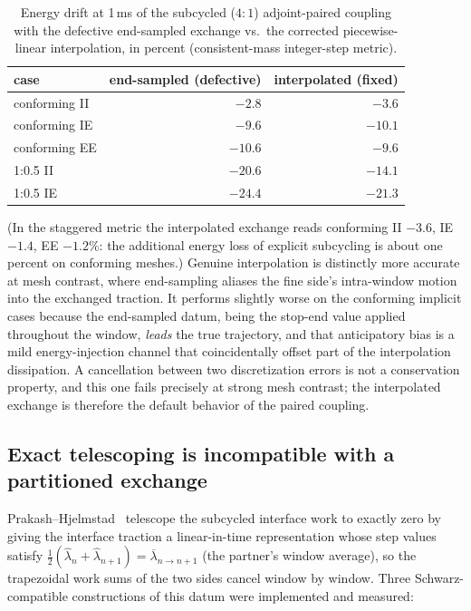 \documentclass[11pt]{article}
\begin{document}
\begin{table}[htbp]
\centering
\caption{Energy drift at 1\,ms of the subcycled ($4{:}1$) adjoint-paired
coupling with the defective end-sampled exchange vs.\ the corrected
piecewise-linear interpolation, in percent (consistent-mass integer-step
metric).}
\label{tab:subcycled}
\begin{tabular}{lrr}
\toprule
case & end-sampled (defective) & interpolated (fixed) \\
\midrule
conforming II & $-2.8$ & $-3.6$ \\
conforming IE & $-9.6$ & $-10.1$ \\
conforming EE & $-10.6$ & $-9.6$ \\
1:0.5 II & $-20.6$ & $\mathbf{-14.1}$ \\
1:0.5 IE & $-24.4$ & $\mathbf{-21.3}$ \\
\bottomrule
\end{tabular}
\end{table}

(In the staggered metric the interpolated exchange reads conforming II
$-3.6$, IE $-1.4$, EE $-1.2\%$: the additional energy loss of explicit subcycling is about
one percent on conforming meshes.) Genuine interpolation is distinctly more accurate
at mesh contrast, where end-sampling aliases the fine side's intra-window
motion into the exchanged traction. It performs slightly worse on the conforming
implicit cases because the end-sampled datum, being the stop-end value
applied throughout the window, \emph{leads} the true trajectory, and that
anticipatory bias is a mild energy-injection channel that coincidentally
offset part of the interpolation dissipation. A cancellation between two
discretization errors is not a conservation property, and this one fails
precisely at strong mesh contrast; the interpolated exchange is therefore the
default behavior of the paired coupling.

\subsection{Exact telescoping is incompatible with a partitioned exchange}
\label{sec:ph}

Prakash--Hjelmstad~\cite{PrakashHjelmstad2004} telescope the subcycled
interface work to exactly zero by giving the interface traction a
linear-in-time representation whose step values satisfy
$\tfrac12(\hat\lambda_n + \hat\lambda_{n+1})
 = \overline{\lambda}_{n \to n+1}$
(the partner's window average), so the trapezoidal work sums of the two
sides cancel window by window. Three Schwarz-compatible constructions of
this datum were implemented and measured:
\end{document}
